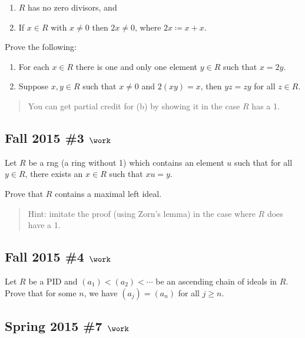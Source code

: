 \begin{enumerate}
\def\labelenumi{\roman{enumi}.}
\tightlist
\item
  \(R\) has no zero divisors, and
\item
  If \(x\in R\) with \(x\neq 0\) then \(2x\neq 0\), where
  \(2x\coloneqq x+x\).
\end{enumerate}

Prove the following:

\begin{enumerate}
\def\labelenumi{\alph{enumi}.}
\item
  For each \(x\in R\) there is one and only one element \(y\in R\) such
  that \(x = 2y\).
\item
  Suppose \(x,y\in R\) such that \(x\neq 0\) and \(2(xy) = x\), then
  \(yz = zy\) for all \(z\in R\).
\end{enumerate}

\begin{quote}
You can get partial credit for (b) by showing it in the case \(R\) has a
1.
\end{quote}

\hypertarget{fall-2015-3-work}{%
\subsection{\texorpdfstring{Fall 2015 \#3
\(\work\)}{Fall 2015 \#3 \textbackslash work}}\label{fall-2015-3-work}}

Let \(R\) be a rng (a ring without 1) which contains an element \(u\)
such that for all \(y\in R\), there exists an \(x\in R\) such that
\(xu=y\).

Prove that \(R\) contains a maximal left ideal.

\begin{quote}
Hint: imitate the proof (using Zorn's lemma) in the case where \(R\)
does have a 1.
\end{quote}

\hypertarget{fall-2015-4-work}{%
\subsection{\texorpdfstring{Fall 2015 \#4
\(\work\)}{Fall 2015 \#4 \textbackslash work}}\label{fall-2015-4-work}}

Let \(R\) be a PID and \((a_1) < (a_2) < \cdots\) be an ascending chain
of ideals in \(R\). Prove that for some \(n\), we have \((a_j) = (a_n)\)
for all \(j\geq n\).

\hypertarget{spring-2015-7-work}{%
\subsection{\texorpdfstring{Spring 2015 \#7
\(\work\)}{Spring 2015 \#7 \textbackslash work}}\label{spring-2015-7-work}}

